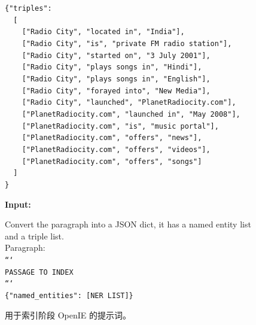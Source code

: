 \documentclass[11pt,UTF8,fontset=fandol]{ctexart}
\begin{document}
\begin{figure}[H]
\begin{tcolorbox}[colback=white,colframe=black!55,boxrule=0.5pt,left=4pt,right=4pt,top=3pt,bottom=3pt,width=\linewidth]
\texttt{\{"triples":}\\
\texttt{~~[}\\
\texttt{~~~~["Radio City", "located in", "India"],}\\
\texttt{~~~~["Radio City", "is", "private FM radio station"],}\\
\texttt{~~~~["Radio City", "started on", "3 July 2001"],}\\
\texttt{~~~~["Radio City", "plays songs in", "Hindi"],}\\
\texttt{~~~~["Radio City", "plays songs in", "English"],}\\
\texttt{~~~~["Radio City", "forayed into", "New Media"],}\\
\texttt{~~~~["Radio City", "launched", "PlanetRadiocity.com"],}\\
\texttt{~~~~["PlanetRadiocity.com", "launched in", "May 2008"],}\\
\texttt{~~~~["PlanetRadiocity.com", "is", "music portal"],}\\
\texttt{~~~~["PlanetRadiocity.com", "offers", "news"],}\\
\texttt{~~~~["PlanetRadiocity.com", "offers", "videos"],}\\
\texttt{~~~~["PlanetRadiocity.com", "offers", "songs"]}\\
\texttt{~~]}\\
\texttt{\}}

\textbf{Input:}

Convert the paragraph into a JSON dict, it has a named entity list and a triple list.\\
Paragraph:\\
\texttt{```}\\
\texttt{PASSAGE TO INDEX}\\
\texttt{```}\\
\texttt{\{"named\_entities": [NER LIST]\}}
\end{tcolorbox}
\caption{用于索引阶段 OpenIE 的提示词。}
\label{fig:9}
\end{figure}
\end{document}
